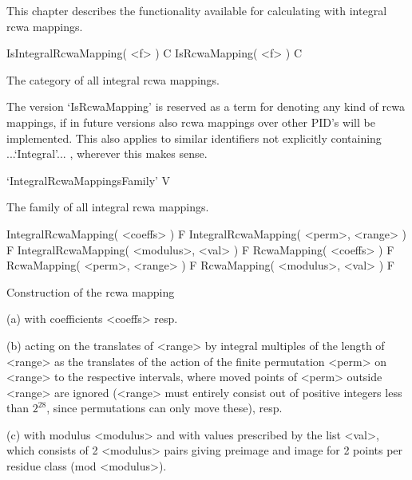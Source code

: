 

This chapter describes the functionality available for calculating with
integral rcwa mappings.


\>IsIntegralRcwaMapping( <f> ) C
\>IsRcwaMapping( <f> ) C

The category of all integral rcwa mappings.

The version `IsRcwaMapping' is reserved as a term for denoting any kind
of rcwa mappings, if in future versions also rcwa mappings over other
PID's will be implemented. This also applies to similar identifiers not
explicitly containing ...`Integral'... , wherever this makes sense.

\>`IntegralRcwaMappingsFamily' V

The family of all integral rcwa mappings.


\>IntegralRcwaMapping( <coeffs> ) F
\>IntegralRcwaMapping( <perm>, <range> ) F
\>IntegralRcwaMapping( <modulus>, <val> ) F
\>RcwaMapping( <coeffs> ) F
\>RcwaMapping( <perm>, <range> ) F
\>RcwaMapping( <modulus>, <val> ) F

Construction of the rcwa mapping 

\beginlist
\item{(a)}
  with coefficients <coeffs> resp.
\item{(b)}
  acting on the translates of <range> by integral multiples
  of the length of <range> as the translates of the action of the finite
  permutation <perm> on <range> to the respective intervals,
  where moved points of <perm> outside <range> are ignored
  (<range> must entirely consist out of positive integers less than
  $2^{28}$, since {\GAP} permutations can only move these), resp.
\item{(c)}
  with modulus <modulus> and with values prescribed by the list <val>,
  which consists of 2 \* <modulus> pairs giving preimage and image for
  2 points per residue class (mod <modulus>).
\endlist

